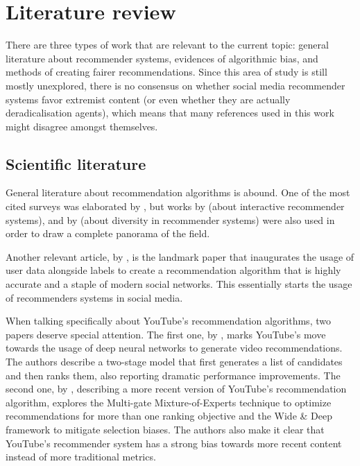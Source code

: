 
\chapter{Literature review}
\label{cap:review}

There are three types of work that are relevant to the current topic: general
literature about recommender systems, evidences of algorithmic bias, and methods
of creating fairer recommendations. Since this area of study is still mostly
unexplored, there is no consensus on whether social media recommender systems
favor extremist content (or even whether they are actually deradicalisation
agents), which means that many references used in this work might disagree
amongst themselves.

\section{Scientific literature}
\label{cap:scientific}

General literature about recommendation algorithms is abound. One of the most
cited surveys was elaborated by \citet{bobadilla_recommender_2013}, but
works by \citet{he_interactive_2016} (about interactive recommender systems),
and by \citet{kunaver_diversity_2017} (about diversity in recommender systems)
were also used in order to draw a complete panorama of the field.

Another relevant article, by \citet{guy_social_2010}, is the landmark paper that
inaugurates the usage of user data alongside labels to create a recommendation
algorithm that is highly accurate and a staple of modern social networks. This
essentially starts the usage of recommenders systems in social media.

When talking specifically about YouTube's recommendation algorithms, two papers
deserve special attention. The first one, by \citet{covington_deep_2016}, marks
YouTube's move towards the usage of deep neural networks to generate video
recommendations. The authors describe a two-stage model that first generates a
list of candidates and then ranks them, also reporting dramatic performance
improvements. The second one, by \citet{zhao_recommending_2019}, describing a
more recent version of YouTube's recommendation algorithm, explores the
Multi-gate Mixture-of-Experts technique to optimize recommendations for more
than one ranking objective and the Wide \& Deep framework to mitigate selection
biases. The authors also make it clear that YouTube's recommender system has a
strong bias towards more recent content instead of more traditional metrics.

